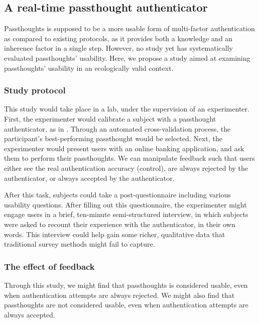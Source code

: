 \documentclass[sigconf]{acmart}
\begin{document}
\subsection{A real-time passthought authenticator}
\label{sec:org852f286}

Passthoughts is supposed to be a more usable form of multi-factor authentication
as compared to existing protocols,
as it provides both a knowledge and an inherence factor in a single step.
However, no study yet has systematically evaluated passthoughts' usability.
Here, we propose a study aimed at examining passthoughts' usability in an ecologically valid context.

\subsubsection{Study protocol}
\label{sec:org44248b2}

This study would take place in a lab, under the supervision of an experimenter.
First, the experimenter would calibrate a subject with a passthought authenticator, as in \cite{Chuang2013b}.
Through an automated cross-validation process, the participant's best-performing passthought would be selected.
Next, the experimenter would present users with an online banking application, and ask them to perform their passthoughts.
We can manipulate feedback such that users either see the real authentication accuracy (control), 
are always rejected by the authenticator, 
or always accepted by the authenticator.

After this task, subjects could take a post-questionnaire including various usability questions.
After filling out this questionnaire, the experimenter might engage users in a brief, ten-minute semi-structured interview,
in which subjects were asked to recount their experience with the authenticator, in their own words.
This interview could help gain some richer, qualitative data that traditional survey methods might fail to capture.

\subsubsection{The effect of feedback}
\label{sec:org7cdb796}

Through this study, we might find 
that passthoughts is considered usable, even when authentication attempts are always rejected.
We might also find that passthoughts are not considered usable, 
even when authentication attempts are always accepted.
\end{document}
